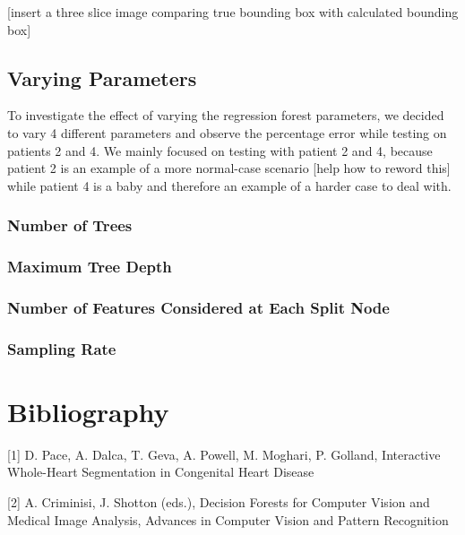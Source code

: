 [insert a three slice image comparing true bounding box with calculated bounding box]

\subsection{Varying Parameters}
To investigate the effect of varying the regression forest parameters, we decided to vary 4 different parameters and observe the percentage error while testing on patients 2 and 4. We mainly focused on testing with patient 2 and 4, because patient 2 is an example of a more normal-case scenario [help how to reword this] while patient 4 is a baby and therefore an example of a harder case to deal with.
\subsubsection{Number of Trees}

\subsubsection{Maximum Tree Depth}
\subsubsection{Number of Features Considered at Each Split Node}
\subsubsection{Sampling Rate}


\section{Bibliography}
[1] D. Pace, A. Dalca, T. Geva, A. Powell, M. Moghari, P. Golland, Interactive Whole-Heart Segmentation in Congenital Heart Disease

[2] A. Criminisi, J. Shotton (eds.), Decision Forests for Computer Vision and Medical Image Analysis, Advances in Computer Vision and Pattern Recognition

